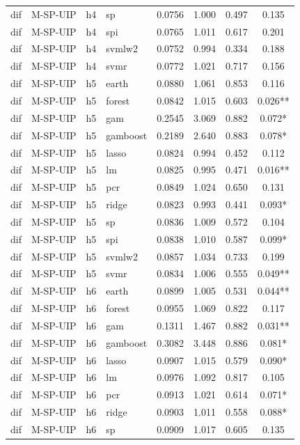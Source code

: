 \begin{ThreePartTable}
\begin{longtable}[t]{llclcccc}
dif & M-SP-UIP & h4 & sp & 0.0756 & 1.000 & 0.497 & 0.135\\
dif & M-SP-UIP & h4 & spi & 0.0765 & 1.011 & 0.617 & 0.201\\
dif & M-SP-UIP & h4 & svmlw2 & 0.0752 & 0.994 & 0.334 & 0.188\\
dif & M-SP-UIP & h4 & svmr & 0.0772 & 1.021 & 0.717 & 0.156\\
\addlinespace
dif & M-SP-UIP & h5 & earth & 0.0880 & 1.061 & 0.853 & 0.116\\
dif & M-SP-UIP & h5 & forest & 0.0842 & 1.015 & 0.603 & 0.026**\\
dif & M-SP-UIP & h5 & gam & 0.2545 & 3.069 & 0.882 & 0.072*\\
dif & M-SP-UIP & h5 & gamboost & 0.2189 & 2.640 & 0.883 & 0.078*\\
dif & M-SP-UIP & h5 & lasso & 0.0824 & 0.994 & 0.452 & 0.112\\
dif & M-SP-UIP & h5 & lm & 0.0825 & 0.995 & 0.471 & 0.016**\\
dif & M-SP-UIP & h5 & pcr & 0.0849 & 1.024 & 0.650 & 0.131\\
dif & M-SP-UIP & h5 & ridge & 0.0823 & 0.993 & 0.441 & 0.093*\\
dif & M-SP-UIP & h5 & sp & 0.0836 & 1.009 & 0.572 & 0.104\\
dif & M-SP-UIP & h5 & spi & 0.0838 & 1.010 & 0.587 & 0.099*\\
dif & M-SP-UIP & h5 & svmlw2 & 0.0857 & 1.034 & 0.733 & 0.199\\
dif & M-SP-UIP & h5 & svmr & 0.0834 & 1.006 & 0.555 & 0.049**\\
\addlinespace
dif & M-SP-UIP & h6 & earth & 0.0899 & 1.005 & 0.531 & 0.044**\\
dif & M-SP-UIP & h6 & forest & 0.0955 & 1.069 & 0.822 & 0.117\\
dif & M-SP-UIP & h6 & gam & 0.1311 & 1.467 & 0.882 & 0.031**\\
dif & M-SP-UIP & h6 & gamboost & 0.3082 & 3.448 & 0.886 & 0.081*\\
dif & M-SP-UIP & h6 & lasso & 0.0907 & 1.015 & 0.579 & 0.090*\\
dif & M-SP-UIP & h6 & lm & 0.0976 & 1.092 & 0.817 & 0.105\\
dif & M-SP-UIP & h6 & pcr & 0.0913 & 1.021 & 0.614 & 0.071*\\
dif & M-SP-UIP & h6 & ridge & 0.0903 & 1.011 & 0.558 & 0.088*\\
dif & M-SP-UIP & h6 & sp & 0.0909 & 1.017 & 0.605 & 0.135\\

\end{longtable}
\end{ThreePartTable}
